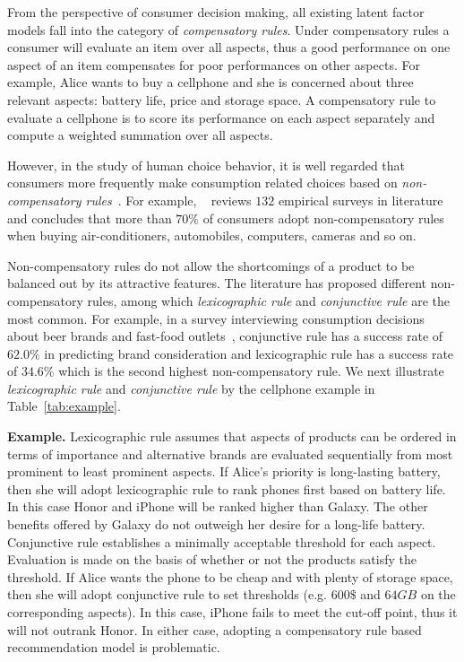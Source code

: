 \documentclass[letterpaper]{article} %
\begin{document}
From the perspective of consumer decision making, all existing latent factor models fall into the category of \emph{compensatory rules}. Under compensatory rules a consumer will evaluate an item over all aspects, thus a good performance on one aspect of an item compensates for poor performances on other aspects. For example, Alice wants to buy a cellphone and she is concerned about three relevant aspects: battery life, price and storage space. A compensatory rule to evaluate a cellphone is to score its performance on each aspect separately and compute a weighted summation over all aspects.


However, in the study of human choice behavior, it is well regarded that consumers more frequently make consumption related choices based on \emph{non-compensatory rules}~\cite{Engel1986Consumer}. For example, ~\cite{Hauser2009Non} reviews $132$ empirical surveys in literature and  concludes that more than $70\%$ of consumers adopt non-compensatory rules when buying air-conditioners, automobiles, computers, cameras and so on. 

Non-compensatory rules do not allow the shortcomings of a product to be balanced out by its attractive features. The literature has proposed different non-compensatory rules, among which  \emph{lexicographic rule} and \emph{conjunctive rule} are the most common. For example, in a survey interviewing consumption decisions about beer brands and fast-food outlets~\cite{Laroche2003Which}, conjunctive rule has a success rate of $62.0\%$ in predicting brand consideration and lexicographic rule has a success rate of $34.6\%$ which is the second highest non-compensatory rule. We next illustrate  \emph{lexicographic rule} and \emph{conjunctive rule}  by the cellphone example in Table~\ref{tab:example}. 

\textbf{Example.} Lexicographic rule assumes that aspects of products can be ordered in terms of importance and alternative brands are evaluated sequentially from most prominent to least prominent aspects.  If Alice's priority is long-lasting battery, then she will adopt lexicographic rule to rank phones first based on battery life. In this case Honor and iPhone will be ranked higher than Galaxy. The other benefits offered by Galaxy  do not outweigh her desire for a long-life battery. Conjunctive rule establishes a minimally acceptable threshold for each aspect. Evaluation is made on the basis of whether or not the products satisfy the threshold. If Alice wants the phone to be cheap and with plenty of storage space, then she will adopt conjunctive rule to set thresholds (e.g. $600\$$ and $64GB$ on the corresponding aspects). In this case, iPhone fails to meet the cut-off point, thus it will not outrank Honor. In either case, adopting a compensatory rule based recommendation model is problematic. 
\end{document}
